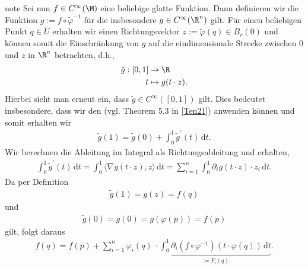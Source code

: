 \documentclass[letterpaper,10pt,german]{jupyterBook}
\begin{document}
\begin{sphinxadmonition}{note}
\sphinxAtStartPar
Sei nun \(f\in C^\infty(\M)\) eine beliebige glatte Funktion.
Dann definieren wir die Funktion \(g:= f\circ \tilde{\varphi}^{-1}\) für die insbesondere \(g\in C^\infty(\R^n)\) gilt.
Für einen beliebigen Punkt \(q\in\tilde{U}\) erhalten wir einen Richtungsvektor \(z:=\tilde{\varphi}(q)\in B_r(0)\) und können somit die Einschränkung von \(g\) auf die eindimensionale Strecke zwischen \(0\) und \(z\) in \(\R^n\) betrachten, d.h.,
\begin{equation*}
\begin{split}\tilde{g}:[0,1] &\to\R\\
t&\mapsto g(t\cdot z).\end{split}
\end{equation*}
\sphinxAtStartPar
Hierbei sieht man erneut ein, dass \(\tilde{g}\in C^\infty([0,1])\) gilt.
Dies bedeutet insbesondere, dass wir den  (vgl. Theorem 5.3 in {[}\hyperlink{cite.references:id15}{Ten21}{]}) anwenden können und somit erhalten wir
\begin{equation*}
\begin{split}\tilde{g}(1) = \tilde{g}(0) + \int_{0}^1 \tilde{g}^\prime(t)\,\mathrm{d}t.\end{split}
\end{equation*}
\sphinxAtStartPar
Wir berechnen die Ableitung im Integral als Richtungsableitung und erhalten,
\begin{equation*}
\begin{split}\int_{0}^1 \tilde{g}^\prime(t) \,\mathrm{d}t
=\int_{0}^1 \langle \nabla g (t\cdot z), z \rangle \,\mathrm{d}t
=\sum_{i=1}^{n} \int_{0}^1  \partial_i g (t\cdot z) \cdot z_i \,\mathrm{d}t.\end{split}
\end{equation*}
\sphinxAtStartPar
Da per Definition
\begin{equation*}
\begin{split}\tilde{g}(1) = g(z)=f(q)\end{split}
\end{equation*}
\sphinxAtStartPar
und
\begin{equation*}
\begin{split}\tilde{g}(0) = g(0) = g(\varphi(p))=f(p)\end{split}
\end{equation*}
\sphinxAtStartPar
gilt, folgt daraus
\begin{equation*}
\begin{split}f(q) = 
f(p) + 
\sum_{i=1}^{n} \varphi_i(q)\ \cdot \underbrace{\int_{0}^1  \partial_i (f\circ \varphi^{-1})(t\cdot \varphi(q)) \, \mathrm{d}t}_{:=F_i(q)}.\end{split}

\end{equation*}
\end{sphinxadmonition}
\end{document}
